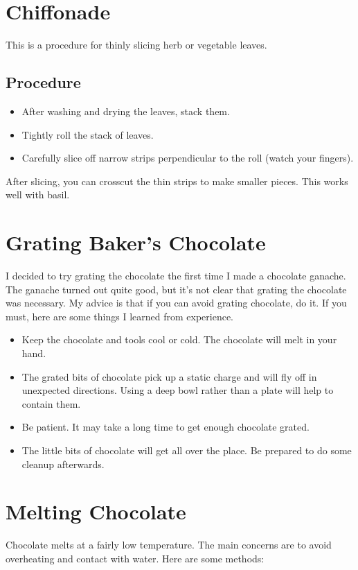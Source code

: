 \documentclass[10pt, openany]{book}
\begin{document}
\section{Chiffonade}
\label{tip:Chiffonade}
This is a procedure for thinly slicing herb or vegetable leaves.
\subsection{Procedure}
\begin{itemize}
  \item After washing and drying the leaves, stack them.
  \item Tightly roll the stack of leaves.
  \item Carefully slice off narrow strips perpendicular to the roll (watch your fingers).
\end{itemize}
After slicing, you can crosscut the thin strips to make smaller pieces.  This works well with basil.

\section{Grating Baker's Chocolate}
\label{tip:GrateChocolate}
I decided to try grating the chocolate the first time I made a chocolate ganache.  The ganache turned out quite good, but it's not clear that grating the chocolate was necessary.  My advice is that if you can avoid grating chocolate, do it.  If you must, here are some things I learned from experience.
\begin{itemize}
  \item Keep the chocolate and tools cool or cold.  The chocolate will melt in your hand.
  \item The grated bits of chocolate pick up a static charge and will fly off in unexpected directions.  Using a deep bowl rather than a plate will help to contain them.
  \item Be patient.  It may take a long time to get enough chocolate grated.
  \item The little bits of chocolate will get all over the place.  Be prepared to do some cleanup afterwards.
\end{itemize}

\section{Melting Chocolate}
\label{tip:MeltChocolate}
Chocolate melts at a fairly low temperature.  The main concerns are to avoid overheating and contact with water.  Here are some methods:
\end{document}
